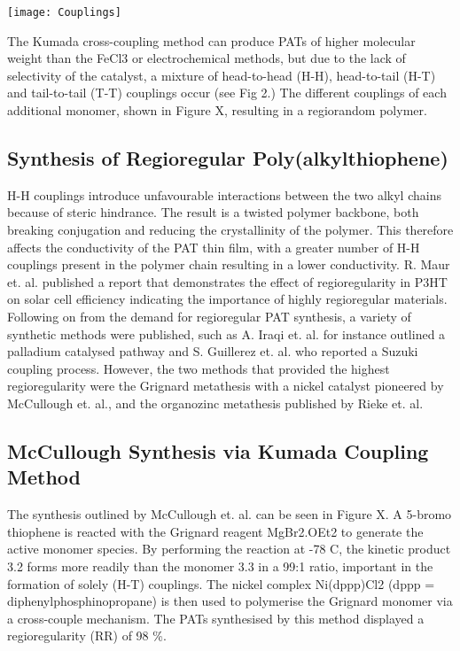 \texttt{[image: Couplings]}

The Kumada cross-coupling method can produce PATs of higher molecular weight than the FeCl3 or electrochemical methods, but due to the lack of selectivity of the catalyst, a mixture of head-to-head (H-H), head-to-tail (H-T) and tail-to-tail (T-T) couplings occur (see Fig 2.) The different couplings of each additional monomer, shown in Figure X, resulting in a regiorandom polymer.

\subsection{Synthesis of Regioregular Poly(alkylthiophene)}

H-H couplings introduce unfavourable interactions between the two alkyl chains because of steric hindrance. The result is a twisted polymer backbone, both breaking conjugation and reducing the crystallinity of the polymer. This therefore affects the conductivity of the PAT thin film, with a greater number of H-H couplings present in the polymer chain resulting in a lower conductivity. R. Maur et. al. published a report that demonstrates the effect of regioregularity in P3HT on solar cell efficiency indicating the importance of highly regioregular materials. 
Following on from the demand for regioregular PAT synthesis, a variety of synthetic methods were published, such as A. Iraqi et. al. for instance outlined a palladium catalysed pathway and S. Guillerez et. al. who reported a Suzuki coupling process. However, the two methods that provided the highest regioregularity were the Grignard metathesis with a nickel catalyst pioneered by McCullough et. al., and the organozinc metathesis published by Rieke et. al.

\subsection{McCullough Synthesis via Kumada Coupling Method}

The synthesis outlined by McCullough et. al. can be seen in Figure X. A 5-bromo thiophene is reacted with the Grignard reagent MgBr2.OEt2 to generate the active monomer species. By performing the reaction at -78 C, the kinetic product 3.2 forms more readily than the monomer 3.3 in a 99:1 ratio, important in the formation of solely (H-T) couplings. The nickel complex Ni(dppp)Cl2 (dppp = diphenylphosphinopropane) is then used to polymerise the Grignard monomer via a cross-couple mechanism. The PATs synthesised by this method displayed a regioregularity (RR) of 98 \%.

